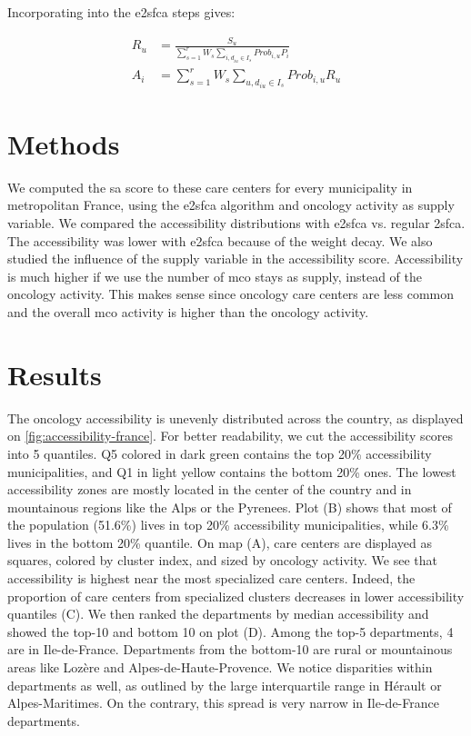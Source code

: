 Incorporating into the \ac{e2sfca} steps gives:

\begin{align}
    R_u &=  \frac{S_u}{\sum_{s=1}^{r} W_s \sum_{i, d_{iu} \in I_s} Prob_{i,u} P_i} \\
    A_i &= \sum_{s=1}^{r} W_s \sum_{u, d_{iu} \in I_s} Prob_{i,u} R_u
\end{align}

\section{Methods}

We computed the \ac{sa} score to these care centers for every municipality in metropolitan France, using the \ac{e2sfca} algorithm and oncology activity as supply variable. We compared the accessibility distributions with \ac{e2sfca} vs. regular \ac{2sfca}. The accessibility was lower with \ac{e2sfca} because of the weight decay. We also studied the influence of the supply variable in the accessibility score. Accessibility is much higher if we use the number of \ac{mco} stays as supply, instead of the oncology activity. This makes sense since oncology care centers are less common and the overall \ac{mco} activity is higher than the oncology activity.

\section{Results}

The oncology accessibility is unevenly distributed across the country, as displayed on \cref{fig:accessibility-france}. For better readability, we cut the accessibility scores into 5 quantiles. Q5 colored in dark green contains the top 20\% accessibility municipalities, and Q1 in light yellow contains the bottom 20\% ones. The lowest accessibility zones are mostly located in the center of the country and in mountainous regions like the Alps or the Pyrenees. Plot (B) shows that most of the population (51.6\%) lives in top 20\% accessibility municipalities, while 6.3\% lives in the bottom 20\% quantile. On map (A), care centers are displayed as squares, colored by cluster index, and sized by oncology activity. We see that accessibility is highest near the most specialized care centers. Indeed, the proportion of care centers from specialized clusters decreases in lower accessibility quantiles (C). We then ranked the departments by median accessibility and showed the top-10 and bottom 10 on plot (D). Among the top-5 departments, 4 are in Ile-de-France. Departments from the bottom-10 are rural or mountainous areas like Lozère and Alpes-de-Haute-Provence.  We notice disparities within departments as well, as outlined by the large interquartile range in Hérault or Alpes-Maritimes. On the contrary, this spread is very narrow in Ile-de-France departments.

